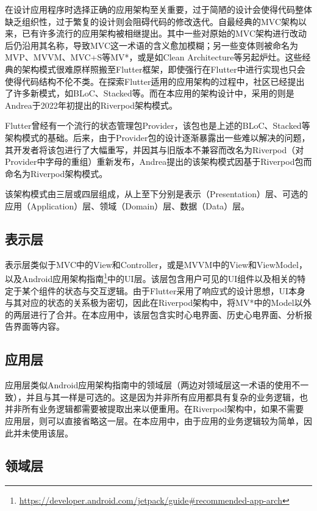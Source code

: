 在设计应用程序时选择正确的应用架构至关重要，过于简陋的设计会使得代码整体缺乏组织性，过于繁复的设计则会阻碍代码的修改迭代。自最经典的MVC架构以来，已有许多流行的应用架构被相继提出。其中一些对原始的MVC架构进行改动后仍沿用其名称，导致MVC这一术语的含义愈加模糊；另一些变体则被命名为MVP、MVVM、MVC+S等MV*，或是如Clean Architecture等另起炉灶。这些经典的架构模式很难原样照搬至Flutter框架，即使强行在Flutter中进行实现也只会使得代码结构不伦不类。在探索Flutter适用的应用架构的过程中，社区已经提出了许多新模式，如BLoC、Stacked等。而在本应用的架构设计中，采用的则是Andrea于2022年初提出的Riverpod架构模式。

Flutter曾经有一个流行的状态管理包Provider，该包也是上述的BLoC、Stacked等架构模式的基础。后来，由于Provider包的设计逐渐暴露出一些难以解决的问题，其开发者将该包进行了大幅重写，并因其与旧版本不兼容而改名为Riverpod（对Provider中字母的重组）重新发布，Andrea提出的该架构模式因基于Riverpod包而命名为Riverpod架构模式。

该架构模式由三层或四层组成，从上至下分别是表示（Presentation）层、可选的应用（Application）层、领域（Domain）层、数据（Data）层。

\subsection{表示层}\label{subsec:presentation-layer}

表示层类似于MVC中的View和Controller，或是MVVM中的View和ViewModel，以及Android应用架构指南\footnote{\url{https://developer.android.com/jetpack/guide\#recommended-app-arch}}中的UI层。该层包含用户可见的UI组件以及相关的特定于某个组件的状态与交互逻辑。由于Flutter采用了响应式的设计思想，UI本身与其对应的状态的关系极为密切，因此在Riverpod架构中，将MV*中的Model以外的两层进行了合并。在本应用中，该层包含实时心电界面、历史心电界面、分析报告界面等内容。

\subsection{应用层}\label{subsec:app-layer}

应用层类似Android应用架构指南中的领域层（两边对领域层这一术语的使用不一致），并且与其一样是可选的。这是因为并非所有应用都具有复杂的业务逻辑，也并非所有业务逻辑都需要被提取出来以便重用。在Riverpod架构中，如果不需要应用层，则可以直接省略这一层。在本应用中，由于应用的业务逻辑较为简单，因此并未使用该层。

\subsection{领域层}\label{subsec:domain-layer}

